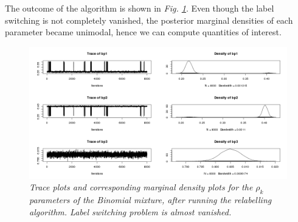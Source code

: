 The outcome of the algorithm is shown in \emph{Fig. \ref{labelBP-stephens-pic}}. Even though the label switching is not completely vanished, the posterior marginal densities of each parameter became unimodal, hence we can compute quantities of interest.
\begin{figure}[!ht]
\begin{center}
 \includegraphics[scale = 0.42]{images/labelBP-stephens.png}
\caption{\emph{Trace plots and corresponding marginal density plots for the $\rho_{k}$ parameters of the Binomial mixture, after running the \citet{Stephens2000} relabelling algorithm. Label switching problem is almost vanished.}}
\label{labelBP-stephens-pic}
\end{center}
\end{figure}
